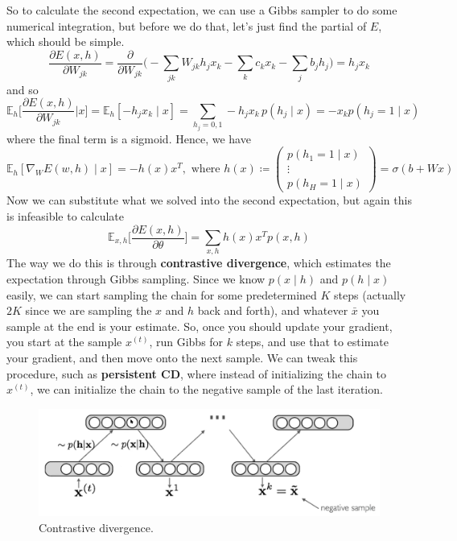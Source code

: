   So to calculate the second expectation, we can use a Gibbs sampler to do some numerical integration, but before we do that, let's just find the partial of $E$, which should be simple. 
  \begin{equation}
    \frac{\partial E(x, h)}{\partial W_{j k}} = \frac{\partial}{\partial W_{j k}} \bigg( - \sum_{j k} W_{j k} h_j x_k - \sum_k c_k x_k - \sum_j b_j h_j \bigg) = h_j x_k
  \end{equation}
  and so 
  \begin{equation}
    \mathbb{E}_{h} \bigg[ \frac{\partial E(x, h)}{\partial W_{j k}} \bigg| x \bigg] = \mathbb{E}_{h} [ -h_j x_k \mid x] = \sum_{h_j = 0, 1} - h_j x_k \, p(h_j \mid x) = - x_k p(h_j = 1 \mid x)
  \end{equation}
  where the final term is a sigmoid. Hence, we have 
  \begin{equation}
    \mathbb{E}_{h} [ \nabla_{W} E(w, h) \mid x] = - h(x) x^T, \text{ where } h(x) \coloneqq \begin{pmatrix} p(h_1 = 1 \mid x) \\ \vdots \\ p(h_H = 1 \mid x) \end{pmatrix} = \sigma(b + W x)
  \end{equation}
  Now we can substitute what we solved into the second expectation, but again this is infeasible to calculate 
  \begin{equation}
    \mathbb{E}_{x, h} \bigg[ \frac{\partial E(x, h)}{\partial\theta}\bigg] = \sum_{x, h} h(x) x^T p(x, h)
  \end{equation}
  The way we do this is through \textbf{contrastive divergence}, which estimates the expectation through Gibbs sampling. Since we know $p(x\mid h)$ and $p(h \mid x)$ easily, we can start sampling the chain for some predetermined $K$ steps (actually $2K$ since we are sampling the $x$ and $h$ back and forth), and whatever $\bar{x}$ you sample at the end is your estimate. So, once you should update your gradient, you start at the sample $x^{(t)}$, run Gibbs for $k$ steps, and use that to estimate your gradient, and then move onto the next sample. We can tweak this procedure, such as \textbf{persistent CD}, where instead of initializing the chain to $x^{(t)}$, we can initialize the chain to the negative sample of the last iteration. 

  \begin{figure}[H]
    \centering 
    \includegraphics[scale=0.4]{img/07_Boltzmann/contrastive_divergence.png}
    \caption{Contrastive divergence. } 
    \label{fig:contrastive_divergence}
  \end{figure}

